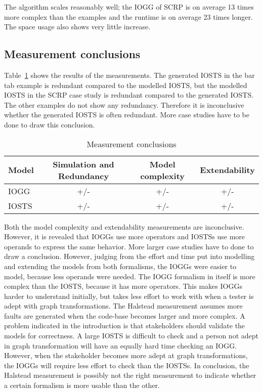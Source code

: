 The algorithm scales reasonably well; the IOGG of SCRP is on average 13 times more complex than the examples and the runtime is on average 23 times longer. The space usage also shows very little increase.

\subsection{Measurement conclusions}
Table~\ref{tab:measurement_conclusions} shows the results of the measurements. The generated IOSTS in the bar tab example is redundant compared to the modelled IOSTS, but the modelled IOSTS in the SCRP case study is redundant compared to the generated IOSTS. The other examples do not show any redundancy. Therefore it is inconclusive whether the generated IOSTS is often redundant. More case studies have to be done to draw this conclusion.

\begin{table}[ht]
\begin{center}
\begin{tabular}{| l | c | c | c |}
  \hline
  \textbf{Model} & \textbf{Simulation and Redundancy} & \textbf{Model complexity} & \textbf{Extendability} \\ \hline
  IOGG & +/- & +/- & +/-\\ \hline
  IOSTS & +/- & +/- & +/-\\ \hline
\end{tabular}
\end{center}
\caption{Measurement conclusions}
\label{tab:measurement_conclusions}
\end{table}

Both the model complexity and extendability measurements are inconclusive. However, it is revealed that IOGGs use more operators and IOSTSs use more operands to express the same behavior. More larger case studies have to done to draw a conclusion. However, judging from the effort and time put into modelling and extending the models from both formalisms, the IOGGs were easier to model, because less operands were needed. The IOGG formalism in itself is more complex than the IOSTS, because it has more operators. This makes IOGGs harder to understand initially, but takes less effort to work with when a tester is adept with graph transformations. The Halstead measurement assumes more faults are generated when the code-base becomes larger and more complex. A problem indicated in the introduction is that stakeholders should validate the models for correctness. A large IOSTS is difficult to check and a person not adept in graph transformation will have an equally hard time checking an IOGG. However, when the stakeholder becomes more adept at graph transformations, the IOGGs will require less effort to check than the IOSTSs. In conclusion, the Halstead measurement is possibly not the right measurement to indicate whether a certain formalism is more usable than the other.